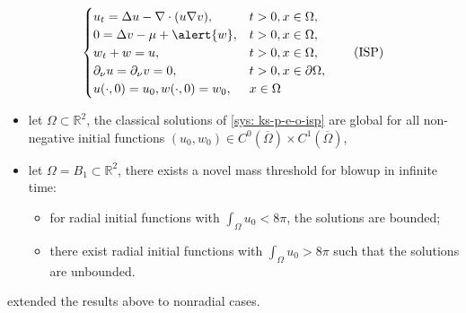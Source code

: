 \begin{frame}
\begin{align}
\begin{cases}
	\label{sys: ks-p-e-o-isp}
		u_t = \Delta u - \nabla \cdot(u\nabla v),&  t>0, x\in\Omega,\\
		0 =  \Delta v - \mu + \alert{w},&  t>0, x\in\Omega,	\\
		w_t + w = u, &  t > 0, x\in\Omega, \\
		\partial_\nu u = \partial_\nu v = 0 , & t >0, x\in\partial\Omega,\\
		u(\cdot, 0) = u_0, w(\cdot, 0) = w_0, & x\in\Omega
\end{cases}\tag{ISP}
\end{align}
\begin{itemize}
  \item let $\Omega\subset\mathbb{R}^2$, the classical solutions of \eqref{sys: ks-p-e-o-isp} are \alert{global} for all non-negative initial functions $(u_0, w_0)\in C^0(\overline{\Omega})\times C^1(\overline{\Omega})$, 
  \item let $\Omega=B_1\subset\mathbb{R}^2$, there exists a novel mass threshold for blowup in infinite time: 
        \begin{itemize}
            \item for radial initial functions with $\int_\Omega u_0 < 8\pi$, the solutions are bounded; 
            \item there exist radial initial functions with $\int_\Omega u_0 > 8\pi$ such that the solutions are unbounded.
        \end{itemize}
\end{itemize}
 extended the results above to nonradial cases.
\end{frame}




